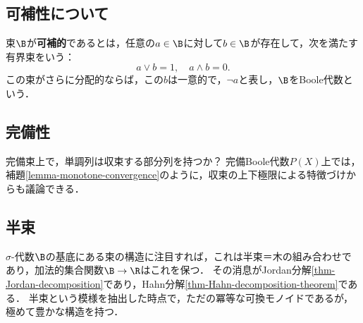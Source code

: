 \documentclass[uplatex, dvipdfmx]{jsreport}
\begin{document}
\subsection{可補性について}

\begin{definition}
    束$\B$が\textbf{可補的}であるとは，任意の$a\in\B$に対して$b\in\B$が存在して，次を満たす有界束をいう：
    \[a\lor b=1,\quad a\land b=0.\]
    この束がさらに分配的ならば，この$b$は一意的で，$\lnot a$と表し，$\B$をBoole代数という．
\end{definition}

\subsection{完備性}

\begin{tcolorbox}[colframe=ForestGreen, colback=ForestGreen!10!white,breakable,colbacktitle=ForestGreen!40!white,coltitle=black,fonttitle=\bfseries\sffamily,
title=]
    完備束上で，単調列は収束する部分列を持つか？
    完備Boole代数$P(X)$上では，補題\ref{lemma-monotone-convergence}のように，収束の上下極限による特徴づけからも議論できる．
\end{tcolorbox}

\subsection{半束}

\begin{tcolorbox}[colframe=ForestGreen, colback=ForestGreen!10!white,breakable,colbacktitle=ForestGreen!40!white,coltitle=black,fonttitle=\bfseries\sffamily,
title=]
    $\sigma$-代数$\B$の基底にある束の構造に注目すれば，これは半束＝木の組み合わせであり，加法的集合関数$\B\to\R$はこれを保つ．
    その消息がJordan分解\ref{thm-Jordan-decomposition}であり，Hahn分解\ref{thm-Hahn-decomposition-theorem}である．
    半束という模様を抽出した時点で，ただの冪等な可換モノイドであるが，極めて豊かな構造を持つ．
\end{tcolorbox}
\end{document}
